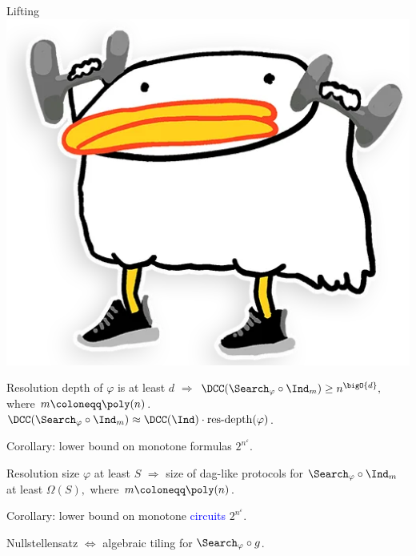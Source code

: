 \begin{frame}{Lifting \includegraphics[scale = 0.04]{pics/utia-lift.png}}

    \begin{theorem}
        Resolution depth of $\varphi$ is at least $d$ $\Rightarrow$
        $\DCC(\Search_{\varphi} \circ \Ind_m) \ge n^{\bigO{d}},$
        where $m \coloneqq \poly(n)$. \alert{$\DCC(\Search_{\varphi} \circ \Ind_m) \approx
            \DCC(\Ind) \cdot \mathrm{res\text{-}depth}(\varphi)$.}
    \end{theorem}

    Corollary: lower bound on monotone formulas $2^{n^{\varepsilon}}$.
    \pause

    \begin{theorem}
        Resolution size $\varphi$ at least $S$ $\Rightarrow$
        size of \alert{dag-like} protocols for $\Search_{\varphi} \circ \Ind_m$ at least $\Omega(S),$
        where $m \coloneqq \poly(n)$.
    \end{theorem}

    Corollary: lower bound on monotone \textcolor{blue}{circuits} $2^{n^{\varepsilon}}$.
    \pause

    \begin{theorem}
        Nullstellensatz $\Leftrightarrow$ \alert{algebraic tiling} for $\Search_{\varphi} \circ g$.
    \end{theorem}

\end{frame}

